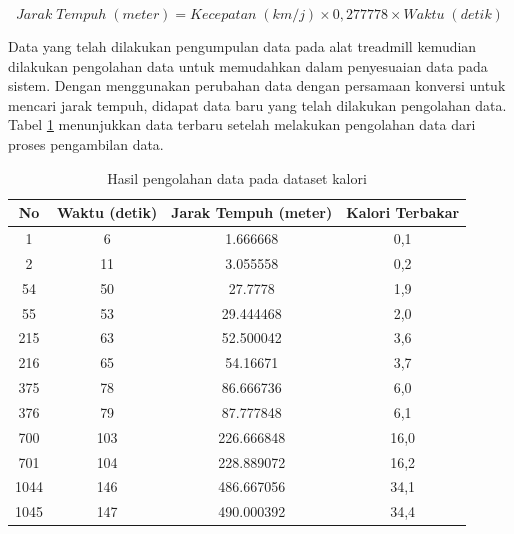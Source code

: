 \begin{equation}
  \label{eq:KonversiJarakTempuh}
  Jarak \; Tempuh \; (meter) = Kecepatan \; (km/j) \times 0,277778 \times Waktu \; (detik)
\end{equation}

Data yang telah dilakukan pengumpulan data pada alat treadmill kemudian dilakukan pengolahan data untuk memudahkan dalam penyesuaian data pada sistem. Dengan menggunakan perubahan data dengan persamaan konversi untuk mencari jarak tempuh, didapat data baru yang telah dilakukan pengolahan data. Tabel \ref{tb:OlahDatasetRegresi} menunjukkan data terbaru setelah melakukan pengolahan data dari proses pengambilan data. 

\begin{longtable}{|c|c|c|c|}
  \caption{Hasil pengolahan data pada dataset kalori}
  \label{tb:OlahDatasetRegresi}                                   \\
  \hline
  \rowcolor[HTML]{C0C0C0}
  \textbf{No} & \textbf{Waktu (detik)} & \textbf{Jarak Tempuh (meter)} & \textbf{Kalori Terbakar} \\
  \hline
  1   & 6    & 1.666668    & 0,1     \\
  \hline
  2   & 11    & 3.055558    & 0,2     \\
  \hline
  54   & 50    & 27.7778    & 1,9     \\
  \hline
  55   & 53    & 29.444468    & 2,0     \\
  \hline
  215   & 63    & 52.500042    & 3,6     \\
  \hline
  216   & 65    & 54.16671    & 3,7     \\
  \hline
  375   & 78    & 86.666736    & 6,0     \\
  \hline
  376   & 79    & 87.777848    & 6,1     \\
  \hline
  700   & 103    & 226.666848    & 16,0     \\
  \hline
  701   & 104    & 228.889072    & 16,2     \\
  \hline
  1044   & 146    & 486.667056    & 34,1     \\
  \hline
  1045   & 147    & 490.000392    & 34,4     \\
  \hline
\end{longtable}

